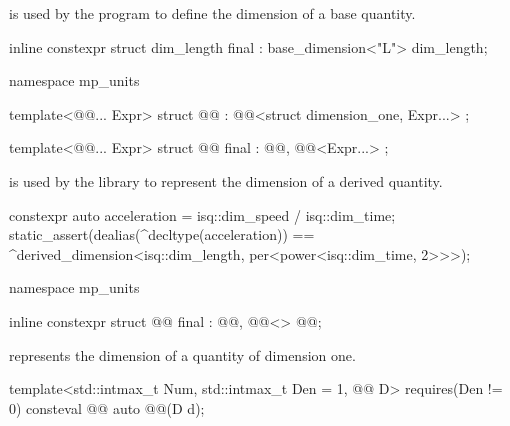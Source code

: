 \pnum
{} is used by the program
to define the dimension of a base quantity.
\begin{example}
\begin{codeblock}
inline constexpr struct dim_length final : base_dimension<"L"> {} dim_length;
\end{codeblock}
\end{example}

\begin{codeblock}
namespace mp_units {

template<@@... Expr>
struct @@ : @@<struct dimension_one, Expr...> {};

template<@@... Expr>
struct @@ final : @@, @@<Expr...> {};

}
\end{codeblock}

\pnum
{} is used by the library
to represent the dimension of a derived quantity.
\begin{example}
\begin{codeblock}
constexpr auto acceleration = isq::dim_speed / isq::dim_time;
static_assert(dealias(^decltype(acceleration)) ==
              ^derived_dimension<isq::dim_length, per<power<isq::dim_time, 2>>>);
\end{codeblock}
\end{example}

\begin{codeblock}
namespace mp_units {

inline constexpr struct @@ final : @@, @@<> {
} @@;

}
\end{codeblock}

\pnum
{} represents the dimension of a quantity of dimension one.

\begin{itemdecl}
template<std::intmax_t Num, std::intmax_t Den = 1, @@ D>
  requires(Den != 0)
consteval @@ auto @@(D d);
\end{itemdecl}

